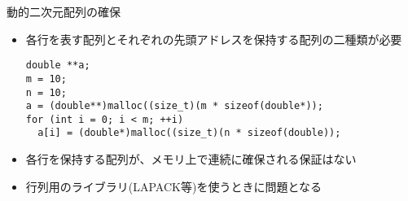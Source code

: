 \begin{frame}[t,fragile]{動的二次元配列の確保}
  \begin{itemize}
    \setlength{\itemsep}{1em}
  \item 各行を表す配列とそれぞれの先頭アドレスを保持する配列の二種類が必要
\begin{lstlisting}
double **a;
m = 10;  
n = 10;  
a = (double**)malloc((size_t)(m * sizeof(double*));
for (int i = 0; i < m; ++i)
  a[i] = (double*)malloc((size_t)(n * sizeof(double));
\end{lstlisting}
\item 各行を保持する配列が、メモリ上で連続に確保される保証はない
\item 行列用のライブラリ(LAPACK等)を使うときに問題となる
  \end{itemize}
\end{frame}
